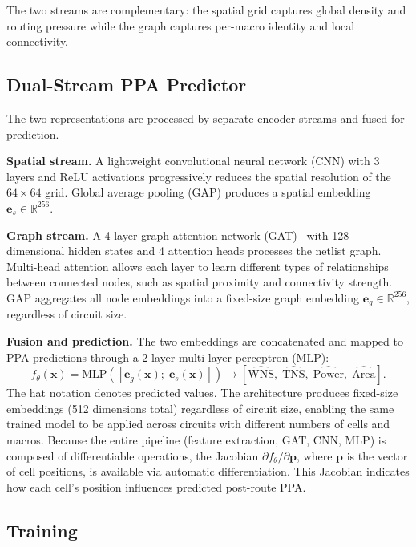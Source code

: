 \documentclass[sigconf,anonymous,review,9pt]{acmart}
\begin{document}
The two streams are complementary: the spatial grid captures global density and routing pressure while the graph captures per-macro identity and local connectivity.

\subsection{Dual-Stream PPA Predictor}
\label{subsec:architecture}

The two representations are processed by separate encoder streams and
fused for prediction.

\textbf{Spatial stream.} A lightweight convolutional neural network (CNN) with 3 layers
and ReLU activations progressively reduces the spatial
resolution of the $64 \times 64$ grid. Global average
pooling (GAP) produces
a spatial embedding $\mathbf{e}_s \in \mathbb{R}^{256}$.

\textbf{Graph stream.} A 4-layer graph attention network
(GAT)~\cite{gat2018} with 128-dimensional hidden states and 4
attention heads processes the netlist graph. Multi-head attention allows
each layer to learn different types of relationships between connected
nodes, such as spatial proximity and connectivity strength. GAP aggregates all node embeddings into a fixed-size graph embedding
$\mathbf{e}_g \in \mathbb{R}^{256}$, regardless of circuit size.

\textbf{Fusion and prediction.} The two embeddings are concatenated and
mapped to PPA predictions through a 2-layer multi-layer perceptron (MLP):
\begin{equation}
\label{eq:predictor}
f_\theta(\mathbf{x}) =
\mathrm{MLP}\!\left([\mathbf{e}_g(\mathbf{x});\;
\mathbf{e}_s(\mathbf{x})]\right) \rightarrow
[\widehat{\mathrm{WNS}},\; \widehat{\mathrm{TNS}},\;
\widehat{\mathrm{Power}},\; \widehat{\mathrm{Area}}].
\end{equation}
The hat notation denotes predicted values. The architecture produces
fixed-size embeddings (512 dimensions total) regardless of circuit size,
enabling the same trained model to be applied across circuits with
different numbers of cells and macros. Because the entire pipeline (feature extraction, GAT, CNN, MLP) is composed of differentiable operations, the Jacobian $\partial f_\theta / \partial \mathbf{p}$, where $\mathbf{p}$ is the vector of cell positions, is available via automatic differentiation. This Jacobian indicates how each cell's position influences predicted post-route PPA.


\subsection{Training}
\label{subsec:training}
\end{document}
